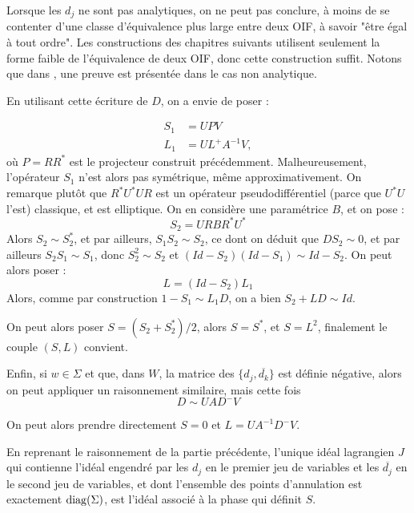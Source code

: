 \begin{preuve}
  Lorsque les $d_j$ ne sont pas analytiques, on ne peut pas conclure,
  à moins de se contenter d'une classe d'équivalence plus large entre
  deux OIF, à savoir "être égal à tout ordre". Les constructions des chapitres suivants utilisent seulement la forme faible de l'équivalence de deux OIF, donc cette construction suffit. Notons que dans \cite{BoutetdeMonvel1974-1975}, une preuve est présentée dans le cas non analytique.
  
  En utilisant cette écriture de $D$, on a envie de poser :
  
  \begin{align*}
    S_1 &= UPV\\
    L_1 &= UL^+A^{-1}V,
  \end{align*}
où $P=RR^*$ est le projecteur construit précédemment. Malheureusement, l'opérateur $S_1$ n'est alors pas symétrique, même approximativement. On remarque plutôt que $R^*U^*UR$ est un opérateur pseudodifférentiel (parce que $U^*U$ l'est) classique, et est elliptique. On en considère une paramétrice $B$, et on pose :
  \begin{equation*}
    S_2=URBR^*U^*
  \end{equation*}
  Alors $S_2 \sim S_2^*$, et par ailleurs, $S_1S_2 \sim S_2$, ce dont on déduit que $DS_2 \sim 0$, et par ailleurs $S_2S_1 \sim S_1$, donc $S_2^2 \sim S_2$ et $(Id-S_2)(Id-S_1) \sim Id-S_2$. On peut alors poser :
  \begin{equation*}
    L=(Id-S_2)L_1
  \end{equation*}
  Alors, comme par construction $1-S_1 \sim L_1D$, on a bien $S_2 + LD \sim Id$.
  
  On peut alors poser $S=(S_2+S_2^*)/2$, alors $S=S^*$, et $S=L^2$, finalement le couple $(S,L)$ convient.
  
  Enfin, si $w \in \Sigma$ et que, dans $W$, la matrice des $\{d_j,\overline{d_k}\}$ est définie négative, alors on peut appliquer un raisonnement similaire, mais cette fois
  \begin{equation*}
    D \sim UAD^-V
  \end{equation*}
  
  On peut alors prendre directement $S=0$ et $L=UA^{-1}D^-V$.
  \end{preuve}
  
  En reprenant le raisonnement de la partie précédente, l'unique idéal lagrangien $J$ qui contienne l'idéal engendré par les $d_j$ en le premier jeu de variables et les $\overline{d_j}$ en le second jeu de variables, et dont l'ensemble des points d'annulation est exactement $\operatorname{diag}(\Sigma)$, est l'idéal associé à la phase qui définit $S$.
